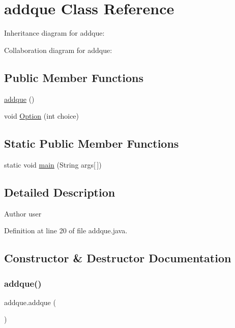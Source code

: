 \hypertarget{classaddque}{}\section{addque Class Reference}
\label{classaddque}


Inheritance diagram for addque\+:


Collaboration diagram for addque\+:
\subsection*{Public Member Functions}
\begin{DoxyCompactItemize}
\item 
\mbox{\hyperlink{classaddque_acdb16599d069ce66c965e5e603f1e3fa}{addque}} ()
\item 
void \mbox{\hyperlink{classaddque_a8e1e059025f2ecdf4b6672b50bcb2370}{Option}} (int choice)
\end{DoxyCompactItemize}
\subsection*{Static Public Member Functions}
\begin{DoxyCompactItemize}
\item 
static void \mbox{\hyperlink{classaddque_aa49caf623e6cc51905a1d59c45a60c32}{main}} (String args\mbox{[}$\,$\mbox{]})
\end{DoxyCompactItemize}


\subsection{Detailed Description}
\begin{DoxyAuthor}{Author}
user 
\end{DoxyAuthor}


Definition at line 20 of file addque.\+java.



\subsection{Constructor \& Destructor Documentation}
\mbox{\label{classaddque_acdb16599d069ce66c965e5e603f1e3fa}} 
\subsubsection{\texorpdfstring{addque()}{addque()}}
{\footnotesize\ttfamily addque.\+addque (\begin{DoxyParamCaption}{ }\end{DoxyParamCaption})}


